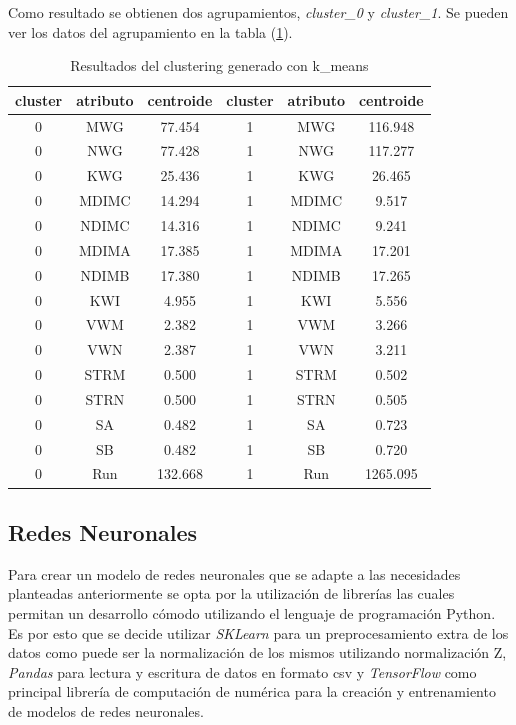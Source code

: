 \documentclass[osajnl,twocolumn,showpacs,superscriptaddress,10pt]{revtex4-1} %
\begin{document}
Como resultado se obtienen dos agrupamientos, \textit{cluster\_0} y \textit{cluster\_1}. Se pueden ver los datos del agrupamiento en la tabla (\ref{table:k_means}).

\begin{table}[h!]
    \centering
    \begin{tabular}{|ccc|ccc|}
        \hline
        cluster & atributo & centroide & cluster & atributo & centroide \\
        \hline
        0	& MWG & 77.454 & 1 &	MWG & 116.948 \\
        0	& NWG & 77.428 & 1 &	NWG & 117.277 \\
        0	& KWG & 25.436 & 1 &	KWG & 26.465 \\
        0	& MDIMC & 14.294 & 1 &	MDIMC & 9.517 \\
        0	& NDIMC & 14.316 & 1 &	NDIMC & 9.241 \\
        0	& MDIMA & 17.385 & 1 &	MDIMA & 17.201 \\
        0	& NDIMB & 17.380 & 1 &	NDIMB & 17.265 \\
        0	& KWI & 4.955 & 1 &	KWI & 5.556 \\
        0	& VWM & 2.382 & 1 &	VWM & 3.266 \\
        0	& VWN & 2.387 & 1 &	VWN & 3.211 \\
        0	& STRM & 0.500 & 1 &	STRM & 0.502 \\
        0	& STRN & 0.500 & 1 &	STRN & 0.505 \\
        0	& SA & 0.482 & 1 &	SA & 0.723 \\
        0	& SB & 0.482 & 1 &	SB & 0.720 \\
        0	& Run & 132.668 & 1 &	Run & 1265.095 \\
        \hline
    \end{tabular}
    \caption{Resultados del clustering generado con k\_means}
    \label{table:k_means}
\end{table}

\subsection{Redes Neuronales}

Para crear un modelo de redes neuronales que se adapte a las necesidades planteadas anteriormente se opta por la utilización de librerías las cuales permitan un desarrollo cómodo utilizando el lenguaje de programación Python. Es por esto que se decide utilizar \textit{SKLearn} para un preprocesamiento extra de los datos como puede ser la normalización de los mismos utilizando normalización Z, \textit{Pandas} para lectura y escritura de datos en formato csv y \textit{TensorFlow} como principal librería de computación de numérica para la creación y entrenamiento de modelos de redes neuronales. \\
\end{document}
